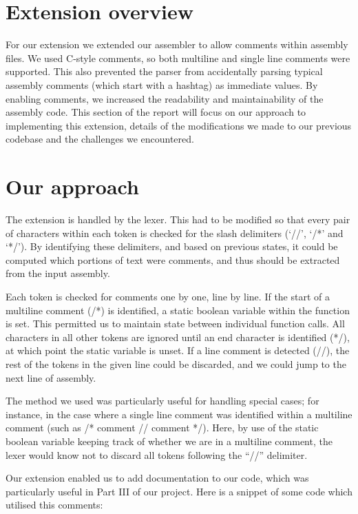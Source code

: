 \documentclass[11pt]{article}
\begin{document}
\section{Extension overview}
For our extension we extended our assembler to allow comments within assembly files. We used C-style comments, so both multiline and single line comments were supported. This also prevented the parser from accidentally parsing typical assembly comments (which start with a hashtag) as immediate values. By enabling comments, we increased the readability and maintainability of the assembly code. This section of the report will focus on our approach to implementing this extension, details of the modifications we made to our previous codebase and the challenges we encountered.

\section{Our approach}
The extension is handled by the lexer. This had to be modified so that every pair of characters within each token is checked for the slash delimiters (‘//’, ‘/*’ and ‘*/’). By identifying these delimiters, and based on previous states, it could be computed which portions of text were comments, and thus should be extracted from the input assembly.

Each token is checked for comments one by one, line by line. If the start of a multiline comment (/*) is identified, a static boolean variable within the function is set. This permitted us to maintain state between individual function calls. All characters in all other tokens are ignored until an end character is identified (*/), at which point the static variable is unset. If a line comment is detected (//), the rest of the tokens in the given line could be discarded, and we could jump to the next line of assembly.

The method we used was particularly useful for handling special cases; for instance, in the case where a single line comment was identified within a multiline comment (such as /* comment // comment */). Here, by use of the static boolean variable keeping track of whether we are in a multiline comment, the lexer would know not to discard all tokens following the “//” delimiter.


Our extension enabled us to add documentation to our code, which was particularly useful in Part III of our project. Here is a snippet of some code which utilised this comments: 
\end{document}
